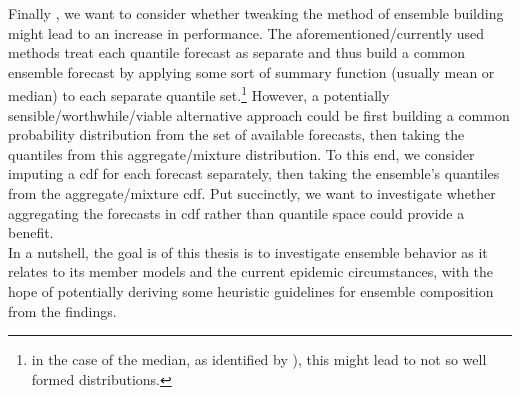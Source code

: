 Finally , we want to consider whether tweaking the method of ensemble building might lead to an increase in performance. The aforementioned/currently used methods treat each quantile forecast as separate and thus build a common ensemble forecast by applying some sort of summary function (usually mean or median) to each separate quantile set.\footnote{in the case of the median, as identified by \cite{bracher_pre-registered_2021}), this might lead to not so well formed distributions.} However, a potentially sensible/worthwhile/viable alternative approach could be first building a common probability distribution from the set of available forecasts, then taking the quantiles from this aggregate/mixture distribution. To this end, we consider imputing a \ac{cdf} for each forecast separately, then taking the ensemble's quantiles from the aggregate/mixture \ac{cdf}. Put succinctly, we want to investigate whether aggregating the forecasts in \ac{cdf} rather than quantile space could provide a benefit. \\
In a nutshell, the goal is of this thesis is to investigate ensemble behavior as it relates to its member models and the current epidemic circumstances, with the hope of potentially deriving some heuristic guidelines for ensemble composition from the findings.
\newpage
